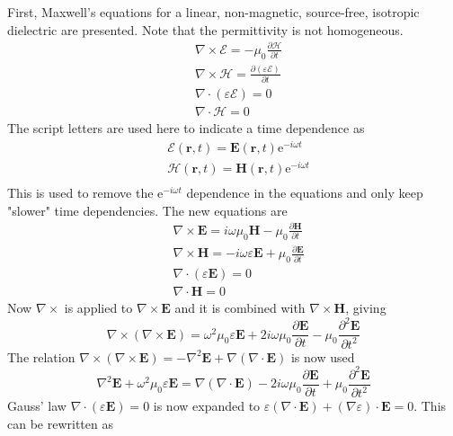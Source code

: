 \documentclass[10pt,a4paper,draft]{scrartcl}
\begin{document}
	First, Maxwell's equations for a linear, non-magnetic, source-free, isotropic dielectric are presented. Note that the permittivity is not homogeneous.
	\begin{align*}
		&\nabla \times \bm{\mathcal{E}} = -\mu_0 \frac{\partial \bm{\mathcal{H}}}{\partial t} \\
		&\nabla \times \bm{\mathcal{H}} = \frac{\partial (\varepsilon \bm{\mathcal{E}})}{\partial t} \\
		&\nabla \cdot (\varepsilon \bm{\mathcal{E}}) = 0 \\
		&\nabla \cdot \bm{\mathcal{H}} = 0
	\end{align*}
	The script letters are used here to indicate a time dependence as
	\begin{align*}
		&\bm{\mathcal{E}}(\bm{r},t) = \bm{E}(\bm{r},t) \text{e}^{-i\omega t} \\
		&\bm{\mathcal{H}}(\bm{r},t) = \bm{H}(\bm{r},t) \text{e}^{-i\omega t} \\
	\end{align*}
	This is used to remove the e$^{-i\omega t}$ dependence in the equations and only keep "slower" time dependencies. The new equations are
	\begin{align*}
		&\nabla \times \bm{E} = i\omega \mu_0 \bm{H} - \mu_0 \frac{\partial \bm{H}}{\partial t} \\
		&\nabla \times \bm{H} = -i\omega \varepsilon \bm{E} + \mu_0 \frac{\partial \bm{E}}{\partial t} \\
		&\nabla \cdot (\varepsilon \bm{E}) = 0 \\
		&\nabla \cdot \bm{H} = 0
	\end{align*}
	Now $\nabla \times$ is applied to $\nabla \times \bm{E}$ and it is combined with $\nabla \times \bm{H}$, giving
	\begin{equation*}
		\nabla \times (\nabla \times \bm{E}) = \omega^2 \mu_0 \varepsilon \bm{E} + 2i\omega \mu_0 \frac{\partial \bm{E}}{\partial t} - \mu_0 \frac{\partial^2 \bm{E}}{\partial t^2}
	\end{equation*}
	The relation $\nabla \times (\nabla \times \bm{E}) = -\nabla^2\bm{E} + \nabla(\nabla \cdot \bm{E})$ is now used
	\begin{equation*}
		\nabla^2\bm{E} + \omega^2 \mu_0 \varepsilon \bm{E} = \nabla(\nabla \cdot \bm{E}) - 2i\omega \mu_0 \frac{\partial \bm{E}}{\partial t} + \mu_0 \frac{\partial^2 \bm{E}}{\partial t^2}
	\end{equation*}
	Gauss' law $\nabla \cdot (\varepsilon \bm{E}) = 0$ is now expanded to $\varepsilon(\nabla \cdot \bm{E}) + (\nabla \varepsilon) \cdot \bm{E} = 0$. This can be rewritten as
\end{document}
